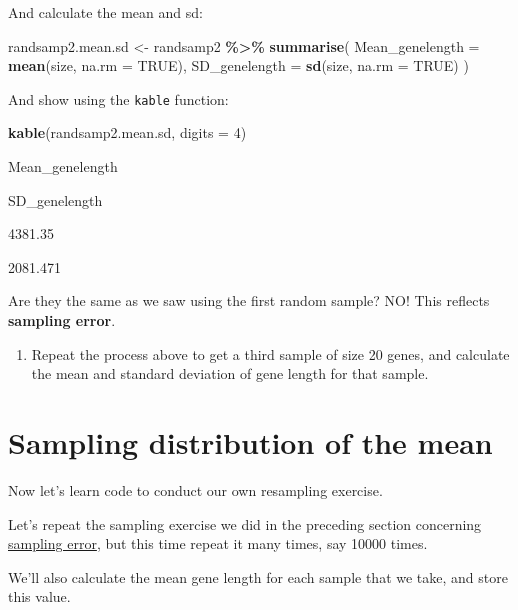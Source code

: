 \documentclass[
]{book}
\newenvironment{Shaded}{\begin{snugshade}}{\end{snugshade}}
\newcommand{\AttributeTok}[1]{\textcolor[rgb]{0.13,0.29,0.53}{#1}}
\newcommand{\ConstantTok}[1]{\textcolor[rgb]{0.56,0.35,0.01}{#1}}
\newcommand{\DecValTok}[1]{\textcolor[rgb]{0.00,0.00,0.81}{#1}}
\newcommand{\FunctionTok}[1]{\textcolor[rgb]{0.13,0.29,0.53}{\textbf{#1}}}
\newcommand{\NormalTok}[1]{#1}
\newcommand{\OtherTok}[1]{\textcolor[rgb]{0.56,0.35,0.01}{#1}}
\newcommand{\SpecialCharTok}[1]{\textcolor[rgb]{0.81,0.36,0.00}{\textbf{#1}}}
\providecommand{\tightlist}{%
  \setlength{\itemsep}{0pt}\setlength{\parskip}{0pt}}
\begin{document}
And calculate the mean and sd:

\begin{Shaded}
\begin{Highlighting}[]
\NormalTok{randsamp2.mean.sd }\OtherTok{\textless{}{-}}\NormalTok{ randsamp2 }\SpecialCharTok{\%\textgreater{}\%}
  \FunctionTok{summarise}\NormalTok{(}
    \AttributeTok{Mean\_genelength =} \FunctionTok{mean}\NormalTok{(size, }\AttributeTok{na.rm =} \ConstantTok{TRUE}\NormalTok{),}
    \AttributeTok{SD\_genelength =} \FunctionTok{sd}\NormalTok{(size, }\AttributeTok{na.rm =} \ConstantTok{TRUE}\NormalTok{)}
\NormalTok{  )}
\end{Highlighting}
\end{Shaded}

And show using the \texttt{kable} function:

\begin{Shaded}
\begin{Highlighting}[]
\FunctionTok{kable}\NormalTok{(randsamp2.mean.sd, }\AttributeTok{digits =} \DecValTok{4}\NormalTok{)}
\end{Highlighting}
\end{Shaded}

Mean\_genelength

SD\_genelength

4381.35

2081.471

Are they the same as we saw using the first random sample? NO! This reflects \textbf{sampling error}.

\begin{enumerate}
\def\labelenumi{\arabic{enumi}.}
\tightlist
\item
  Repeat the process above to get a third sample of size 20 genes, and calculate the mean and standard deviation of gene length for that sample.
\end{enumerate}

\section{Sampling distribution of the mean}\label{sampdistmean}

Now let's learn code to conduct our own resampling exercise.

Let's repeat the sampling exercise we did in the preceding section concerning \hyperref[sampling_error]{sampling error}, but this time repeat it many times, say 10000 times.

We'll also calculate the mean gene length for each sample that we take, and store this value.
\end{document}
